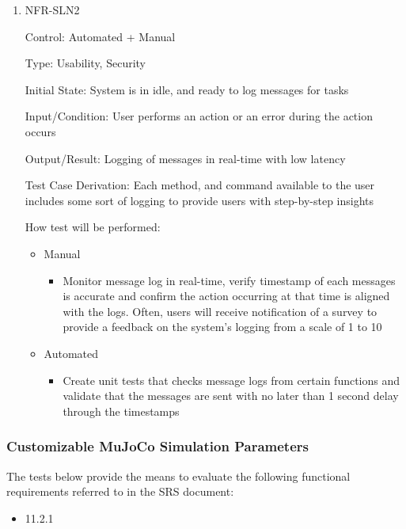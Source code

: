 \documentclass[12pt, titlepage]{article}
\begin{document}
\begin{enumerate}

\item NFR-SLN2

Control: Automated + Manual

Type: Usability, Security

Initial State: System is in idle, and ready to log messages for tasks

Input/Condition: User performs an action or an error during the action occurs

Output/Result: Logging of messages in real-time with low latency

Test Case Derivation: Each method, and command available to the user includes some sort of logging to provide users with step-by-step insights

How test will be performed:
\begin{itemize}
  \item Manual
  \begin{itemize}
    \item Monitor message log in real-time, verify timestamp of each messages is accurate and confirm the action occurring at that time is aligned with the logs. Often, users will receive notification of a survey to provide a feedback on the system's logging from a scale of 1 to 10
  \end{itemize}
  \item Automated
  \begin{itemize}
    \item Create unit tests that checks message logs from certain functions and validate that the messages are sent with no later than 1 second delay through the timestamps
  \end{itemize}
\end{itemize}

\end{enumerate}

\subsubsection{Customizable MuJoCo Simulation Parameters}

The tests below provide the means to evaluate the following functional requirements referred to in the SRS document:
\begin{itemize}
  \item 11.2.1
\end{itemize}
\end{document}
